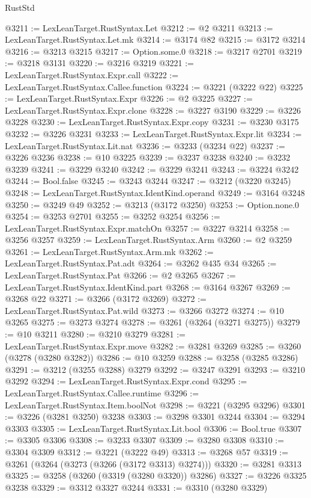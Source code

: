 \begin{lexlean}{RustStd}
\begin{coremodule}
@3211 := LexLeanTarget.RustSyntax.Let
@3212 := @2 @3211
@3213 := LexLeanTarget.RustSyntax.Let.mk
@3214 := @3174 @82
@3215 := @3172 @3214
@3216 := @3213 @3215
@3217 := Option.some.{0}
@3218 := @3217 @2701
@3219 := @3218 @3131
@3220 := @3216 @3219
@3221 := LexLeanTarget.RustSyntax.Expr.call
@3222 := LexLeanTarget.RustSyntax.Callee.function
@3224 := @3221 (@3222 @22)
@3225 := LexLeanTarget.RustSyntax.Expr
@3226 := @2 @3225
@3227 := LexLeanTarget.RustSyntax.Expr.clone
@3228 := @3227 @3190
@3229 := @3226 @3228
@3230 := LexLeanTarget.RustSyntax.Expr.copy
@3231 := @3230 @3175
@3232 := @3226 @3231
@3233 := LexLeanTarget.RustSyntax.Expr.lit
@3234 := LexLeanTarget.RustSyntax.Lit.nat
@3236 := @3233 (@3234 @22)
@3237 := @3226 @3236
@3238 := @10 @3225
@3239 := @3237 @3238
@3240 := @3232 @3239
@3241 := @3229 @3240
@3242 := @3229 @3241
@3243 := @3224 @3242
@3244 := Bool.false
@3245 := @3243 @3244
@3247 := @3212 (@3220 @3245)
@3248 := LexLeanTarget.RustSyntax.IdentKind.operand
@3249 := @3164 @3248
@3250 := @3249 @49
@3252 := @3213 (@3172 @3250)
@3253 := Option.none.{0}
@3254 := @3253 @2701
@3255 := @3252 @3254
@3256 := LexLeanTarget.RustSyntax.Expr.matchOn
@3257 := @3227 @3214
@3258 := @3256 @3257
@3259 := LexLeanTarget.RustSyntax.Arm
@3260 := @2 @3259
@3261 := LexLeanTarget.RustSyntax.Arm.mk
@3262 := LexLeanTarget.RustSyntax.Pat.adt
@3264 := @3262 @435 @34
@3265 := LexLeanTarget.RustSyntax.Pat
@3266 := @2 @3265
@3267 := LexLeanTarget.RustSyntax.IdentKind.part
@3268 := @3164 @3267
@3269 := @3268 @22
@3271 := @3266 (@3172 @3269)
@3272 := LexLeanTarget.RustSyntax.Pat.wild
@3273 := @3266 @3272
@3274 := @10 @3265
@3275 := @3273 @3274
@3278 := @3261 (@3264 (@3271 @3275))
@3279 := @10 @3211
@3280 := @3210 @3279
@3281 := LexLeanTarget.RustSyntax.Expr.move
@3282 := @3281 @3269
@3285 := @3260 (@3278 (@3280 @3282))
@3286 := @10 @3259
@3288 := @3258 (@3285 @3286)
@3291 := @3212 (@3255 @3288) @3279
@3292 := @3247 @3291
@3293 := @3210 @3292
@3294 := LexLeanTarget.RustSyntax.Expr.cond
@3295 := LexLeanTarget.RustSyntax.Callee.runtime
@3296 := LexLeanTarget.RustSyntax.Item.boolNot
@3298 := @3221 (@3295 @3296)
@3301 := @3226 (@3281 @3250) @3238
@3303 := @3298 @3301 @3244
@3304 := @3294 @3303
@3305 := LexLeanTarget.RustSyntax.Lit.bool
@3306 := Bool.true
@3307 := @3305 @3306
@3308 := @3233 @3307
@3309 := @3280 @3308
@3310 := @3304 @3309
@3312 := @3221 (@3222 @49)
@3313 := @3268 @57
@3319 := @3261 (@3264 (@3273 (@3266 (@3172 @3313) @3274)))
@3320 := @3281 @3313
@3325 := @3258 (@3260 (@3319 (@3280 @3320)) @3286)
@3327 := @3226 @3325 @3238
@3329 := @3312 @3327 @3244
@3331 := @3310 (@3280 @3329)

\end{coremodule}
\end{lexlean}
